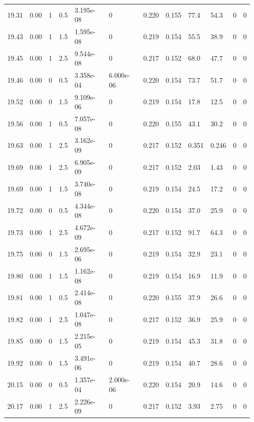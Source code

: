 \documentclass[preview]{standalone}
\begin{document}
{{{{{{{{{\begin{tabular}{L{1.2cm}C{1.2cm} C{0.3cm}C{0.5cm} C{1.4cm}C{1.4cm} C{1.4cm}C{1.4cm} C{1.6cm}C{1.6cm} C{1.6cm}C{1.6cm}}
  19.31  &  0.00  & 1     & 0.5 &  3.195e-08  & 0  &  0.220&   0.155& 77.4 & 54.3   &  0 & 0  \\ 
  19.43  &  0.00  & 1     & 1.5 &  1.595e-08  & 0  &  0.219&   0.154& 55.5 & 38.9   &  0 & 0  \\ 
  19.45  &  0.00  & 1     & 2.5 &  9.544e-08  & 0  &  0.217&   0.152& 68.0 & 47.7   &  0 & 0  \\ 
  19.46  &  0.00  & 0     & 0.5 &  3.358e-04  & 6.000e-06  &  0.220&   0.154& 73.7 & 51.7   &  0 & 0  \\ 
  19.52  &  0.00  & 0     & 1.5 &  9.109e-06  & 0  &  0.219&   0.154& 17.8 & 12.5   &  0 & 0  \\ 
  19.56  &  0.00  & 1     & 0.5 &  7.057e-08  & 0  &  0.220&   0.155& 43.1 & 30.2   &  0 & 0  \\ 
  19.63  &  0.00  & 1     & 2.5 &  3.162e-09  & 0  &  0.217&   0.152& 0.351 & 0.246   &  0 & 0  \\ 
  19.69  &  0.00  & 1     & 2.5 &  6.905e-09  & 0  &  0.217&   0.152& 2.03 & 1.43   &  0 & 0  \\ 
  19.69  &  0.00  & 1     & 1.5 &  3.740e-08  & 0  &  0.219&   0.154& 24.5 & 17.2   &  0 & 0  \\ 
  19.72  &  0.00  & 0     & 0.5 &  4.344e-08  & 0  &  0.220&   0.154& 37.0 & 25.9   &  0 & 0  \\ 
  19.73  &  0.00  & 1     & 2.5 &  4.672e-09  & 0  &  0.217&   0.152& 91.7 & 64.3   &  0 & 0  \\ 
  19.75  &  0.00  & 0     & 1.5 &  2.695e-06  & 0  &  0.219&   0.154& 32.9 & 23.1   &  0 & 0  \\ 
  19.80  &  0.00  & 1     & 1.5 &  1.162e-08  & 0  &  0.219&   0.154& 16.9 & 11.9   &  0 & 0  \\ 
  19.81  &  0.00  & 1     & 0.5 &  2.414e-08  & 0  &  0.220&   0.155& 37.9 & 26.6   &  0 & 0  \\ 
  19.82  &  0.00  & 1     & 2.5 &  1.047e-08  & 0  &  0.217&   0.152& 36.9 & 25.9   &  0 & 0  \\ 
  19.85  &  0.00  & 0     & 1.5 &  2.215e-05  & 0  &  0.219&   0.154& 45.3 & 31.8   &  0 & 0  \\ 
  19.92  &  0.00  & 0     & 1.5 &  3.491e-06  & 0  &  0.219&   0.154& 40.7 & 28.6   &  0 & 0  \\ 
  20.15  &  0.00  & 0     & 0.5 &  1.357e-04  & 2.000e-06  &  0.220&   0.154& 20.9 & 14.6   &  0 & 0  \\ 
  20.17  &  0.00  & 1     & 2.5 &  2.226e-09  & 0  &  0.217&   0.152& 3.93 & 2.75   &  0 & 0  \\ 

\end{tabular}}}}}}}}}}
\end{document}
